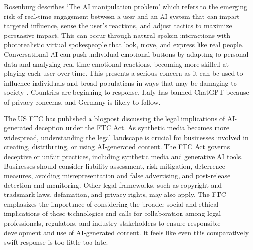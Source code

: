 Rosenburg describes \href{https://bigthink.com/the-present/danger-conversational-ai/}{`The AI manipulation problem'} which refers to the emerging risk of real-time engagement between a user and an AI system that can impart targeted influence, sense the user's reactions, and adjust tactics to maximize persuasive impact. This can occur through natural spoken interactions with photorealistic virtual spokespeople that look, move, and express like real people. Conversational AI can push individual emotional buttons by adapting to personal data and analyzing real-time emotional reactions, becoming more skilled at playing each user over time. This presents a serious concern as it can be used to influence individuals and broad populations in ways that may be damaging to society \cite{Rosenberg2023}. Countries are beginning to response. Italy has banned ChatGPT because of privacy concerns, and Germany is likely to follow.\par 
The US FTC has published a \href{}{blogpost} discussing the legal implications of AI-generated deception under the FTC Act. As synthetic media becomes more widespread, understanding the legal landscape is crucial for businesses involved in creating, distributing, or using AI-generated content. The FTC Act governs deceptive or unfair practices, including synthetic media and generative AI tools. Businesses should consider liability assessment, risk mitigation, deterrence measures, avoiding misrepresentation and false advertising, and post-release detection and monitoring. Other legal frameworks, such as copyright and trademark laws, defamation, and privacy rights, may also apply. The FTC emphasizes the importance of considering the broader social and ethical implications of these technologies and calls for collaboration among legal professionals, regulators, and industry stakeholders to ensure responsible development and use of AI-generated content. It feels like even this comparatively swift response is too little too late. 
